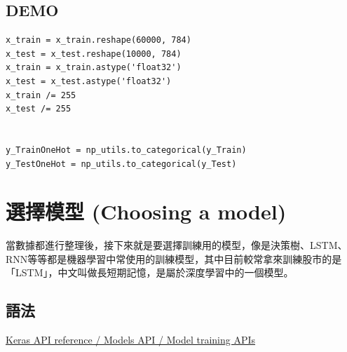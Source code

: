 \documentclass[a4paper,12pt]{article}
\begin{document}
\subsection{DEMO}
\label{sec:org943fe5d}
\lstset{breaklines=true,language=Python,label= ,caption= ,captionpos=b,numbers=none}
\begin{lstlisting}
x_train = x_train.reshape(60000, 784)
x_test = x_test.reshape(10000, 784)
x_train = x_train.astype('float32')
x_test = x_test.astype('float32')
x_train /= 255
x_test /= 255


y_TrainOneHot = np_utils.to_categorical(y_Train)
y_TestOneHot = np_utils.to_categorical(y_Test)
\end{lstlisting}

\section{選擇模型 (Choosing a model)}
\label{sec:orgaea166f}
當數據都進行整理後，接下來就是要選擇訓練用的模型，像是決策樹、LSTM、RNN等等都是機器學習中常使用的訓練模型，其中目前較常拿來訓練股市的是「LSTM」，中文叫做長短期記憶，是屬於深度學習中的一個模型。\\

\subsection{語法}
\label{sec:org1d45e47}
\href{https://keras.io/api/models/model\_training\_apis/}{Keras API reference / Models API / Model training APIs }\\
\end{document}
